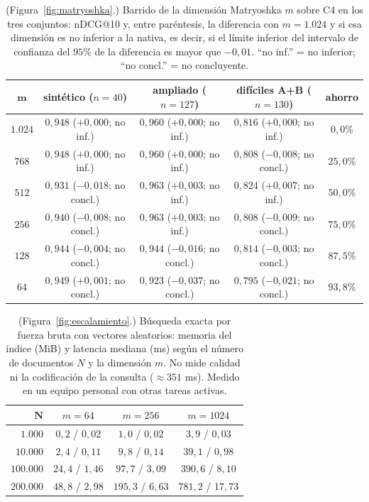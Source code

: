 \documentclass[11pt,letterpaper]{article}
\numberwithin{equation}{section}
\begin{document}
\begin{table}[!htbp]
\centering
\footnotesize
\setlength{\tabcolsep}{4pt}
\renewcommand{\arraystretch}{1.25}
\caption{(Figura~\ref{fig:matryoshka}.) Barrido de la dimensión Matryoshka $m$ sobre C4 en los tres conjuntos: nDCG@10 y, entre paréntesis, la diferencia con $m=1.024$ y si esa dimensión es no inferior a la nativa, es decir, si el límite inferior del intervalo de confianza del $95\%$ de la diferencia es mayor que $-0{,}01$. ``no inf.'' = no inferior; ``no concl.'' = no concluyente.}
\label{tab:matryoshka}
\begin{tabularx}{\textwidth}{@{}c C C C c@{}}
\toprule
$\boldsymbol{m}$ & \textbf{sintético} ($n{=}40$) & \textbf{ampliado} ($n{=}127$) & \textbf{difíciles A+B} ($n{=}130$) & \textbf{ahorro} \\
\midrule
$1.024$ & $0{,}948$ ($+0{,}000$; no inf.) & $0{,}960$ ($+0{,}000$; no inf.) & $0{,}816$ ($+0{,}000$; no inf.) & $0{,}0\%$ \\
$768$ & $0{,}948$ ($+0{,}000$; no inf.) & $0{,}960$ ($+0{,}000$; no inf.) & $0{,}808$ ($-0{,}008$; no concl.) & $25{,}0\%$ \\
$512$ & $0{,}931$ ($-0{,}018$; no concl.) & $0{,}963$ ($+0{,}003$; no inf.) & $0{,}824$ ($+0{,}007$; no inf.) & $50{,}0\%$ \\
$256$ & $0{,}940$ ($-0{,}008$; no concl.) & $0{,}963$ ($+0{,}003$; no inf.) & $0{,}808$ ($-0{,}009$; no concl.) & $75{,}0\%$ \\
$128$ & $0{,}944$ ($-0{,}004$; no concl.) & $0{,}944$ ($-0{,}016$; no concl.) & $0{,}814$ ($-0{,}003$; no concl.) & $87{,}5\%$ \\
$64$ & $0{,}949$ ($+0{,}001$; no concl.) & $0{,}923$ ($-0{,}037$; no concl.) & $0{,}795$ ($-0{,}021$; no concl.) & $93{,}8\%$ \\
\bottomrule
\end{tabularx}
\end{table}

\begin{table}[!htbp]
\centering
\footnotesize
\setlength{\tabcolsep}{5pt}
\renewcommand{\arraystretch}{1.25}
\caption{(Figura~\ref{fig:escalamiento}.) Búsqueda exacta por fuerza bruta con vectores aleatorios: memoria del índice (MiB) y latencia mediana (ms) según el número de documentos $N$ y la dimensión $m$. No mide calidad ni la codificación de la consulta ($\approx 351$ ms). Medido en un equipo personal con otras tareas activas.}
\label{tab:escalamiento}
\begin{tabularx}{\textwidth}{@{}r c c c @{}}
\toprule
$\boldsymbol{N}$ & \textbf{$m=64$} & \textbf{$m=256$} & \textbf{$m=1024$} \\
\midrule
$1.000$ & $0{,}2$ / $0{,}02$ & $1{,}0$ / $0{,}02$ & $3{,}9$ / $0{,}03$ \\
$10.000$ & $2{,}4$ / $0{,}11$ & $9{,}8$ / $0{,}14$ & $39{,}1$ / $0{,}98$ \\
$100.000$ & $24{,}4$ / $1{,}46$ & $97{,}7$ / $3{,}09$ & $390{,}6$ / $8{,}10$ \\
$200.000$ & $48{,}8$ / $2{,}98$ & $195{,}3$ / $6{,}63$ & $781{,}2$ / $17{,}73$ \\
\bottomrule
\end{tabularx}
\end{table}
\end{document}
